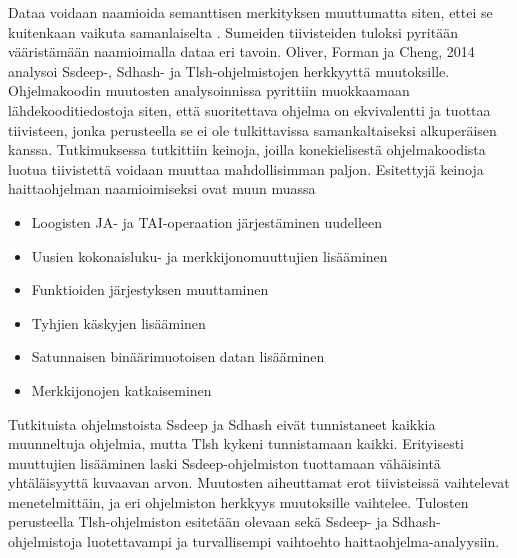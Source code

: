 Dataa voidaan naamioida semanttisen merkityksen muuttumatta siten, ettei se
kuitenkaan vaikuta samanlaiselta \parencite{oliver14}. Sumeiden tiivisteiden
tuloksi pyritään vääristämään naamioimalla dataa eri tavoin.
Oliver, Forman ja Cheng, 2014 analysoi Ssdeep-, Sdhash- ja Tlsh-ohjelmistojen herkkyyttä muutoksille. Ohjelmakoodin muutosten analysoinnissa pyrittiin muokkaamaan lähdekooditiedostoja siten, että suoritettava ohjelma on ekvivalentti ja tuottaa tiivisteen, jonka perusteella se ei ole tulkittavissa samankaltaiseksi alkuperäisen kanssa. Tutkimuksessa tutkittiin keinoja, joilla konekielisestä ohjelmakoodista luotua tiivistettä voidaan
muuttaa mahdollisimman paljon. Esitettyjä keinoja haittaohjelman naamioimiseksi
ovat muun muassa

\begin{itemize}
   \item Loogisten JA- ja TAI-operaation järjestäminen uudelleen
   \item Uusien kokonaisluku- ja merkkijonomuuttujien lisääminen
   \item Funktioiden järjestyksen muuttaminen
   \item Tyhjien käskyjen lisääminen
   \item Satunnaisen binäärimuotoisen datan lisääminen
   \item Merkkijonojen katkaiseminen
\end{itemize}

Tutkituista ohjelmstoista Ssdeep ja Sdhash eivät tunnistaneet kaikkia muunneltuja ohjelmia, mutta Tlsh kykeni tunnistamaan kaikki. Erityisesti muuttujien lisääminen laski Ssdeep-ohjelmiston tuottamaan vähäisintä yhtäläisyyttä kuvaavan arvon. Muutosten aiheuttamat erot tiivisteissä vaihtelevat menetelmittäin, ja eri ohjelmiston herkkyys muutoksille vaihtelee. Tulosten perusteella Tlsh-ohjelmiston esitetään olevaan sekä Ssdeep- ja Sdhash-ohjelmistoja luotettavampi ja turvallisempi vaihtoehto haittaohjelma-analyysiin.
